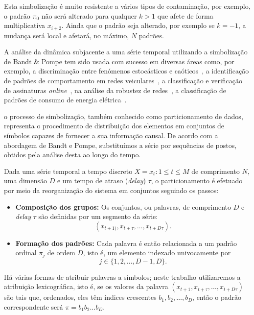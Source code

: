 Esta simbolização é muito resistente a vários tipos de contaminação, por exemplo, o padrão $\pi_0$ não será alterado para qualquer $k>1$ que afete de forma multiplicativa $x_{i+2}$.
Ainda que o padrão seja alterado, por exemplo se $k=-1$, a mudança será local e afetará, no máximo, $N$ padrões.
 
A análise da dinâmica subjacente a uma série temporal utilizando a simbolização de Bandt \& Pompe tem sido usada com sucesso em diversas áreas como, por exemplo, 
a discriminação entre fenómenos estocásticos e caóticos~\cite{DistinguishingNoiseFromChaos}, 
a identificação de padrões de comportamento em redes veiculares~\cite{CharacterizationVehicleBehaviorInformationTheory},
a classificação e verificação de assinaturas \textit{online}~\cite{ClassificationVerificationOnlineHandwrittenSignatures},
na análise da robustez de redes~\cite{InformationTheoryPerspectiveNetworkRobustness},
a classificação de padrões de consumo de energia elétrica~\cite{CharacterizationElectricLoadInformationTheoryQuantifiers}.

o processo de simbolização, também conhecido como particionamento de dados, representa o procedimento de distribuição dos elementos em conjuntos de símbolos capazes de fornecer a sua informação causal. 
De acordo com a abordagem de Bandt e Pompe, substituímos a série por sequências de postos, obtidos pela análise desta ao longo do tempo.

Dada uma série temporal a tempo discreto $X = {x_t:1\leq t\leq M}$ de comprimento $N$, uma dimensão $D$ e um tempo de atraso (\textit{delay}) $\tau$, o particionamento é efetuado por meio da reorganização do sistema em conjuntos seguindo os passos:
\begin{itemize}
	\item \textbf{Composição dos grupos:} Os conjuntos, ou palavras, de comprimento $D$ e \textit{delay} $\tau$ são definidas por um segmento da série: 
	 $$ (x_{t+1)},x_{t+\tau},\ldots, x_{t+D\tau}).$$ 

	\item \textbf{Formação dos padrões: } Cada palavra é então relacionada a um padrão ordinal $\pi_j$ de ordem $D$, isto é, um elemento indexado univocamente por
	$$ j\in\{1, 2,\ldots, D-1, D\}. $$
\end{itemize}

Há várias formas de atribuir palavras a símbolos; neste trabalho utilizaremos a atribuição lexicográfica, isto é, se os valores da palavra $(x_{t+1},x_{t+\tau},\ldots, x_{t+D\tau})$ são tais que, ordenados, eles têm índices crescentes $b_1,b_2,\dots,b_D$, então o padrão correspondente será $\pi=b_1b_2\dots b_D$.

